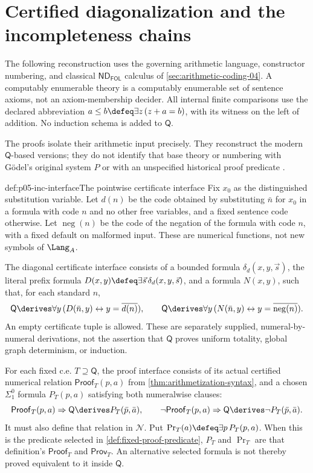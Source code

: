 \section{Certified diagonalization and the incompleteness chains}
\label{sec:p05-inc}

The following reconstruction uses the governing arithmetic language,
constructor numbering, and classical \(\mathsf{ND}_{\mathsf{FOL}}\) calculus of
\cref{sec:arithmetic-coding-04}. A computably enumerable theory is a
computably enumerable set of sentence axioms, not an axiom-membership
decider. All internal finite comparisons use the declared abbreviation
\(a\leq b\defeq\exists z\,(z+a=b)\), with its witness on the left of
addition. No induction schema is added to \(\mathsf Q\).

The proofs isolate their arithmetic input precisely. They reconstruct the
modern \(\mathsf Q\)-based versions; they do not identify that base theory
or numbering with G\"odel's original system \(P\)
\cite[Satz V--VI, pp.~186--190]{Godel1931} or with an unspecified historical
proof predicate \cite{Rosser1936}.

\begin{hbdefinition}{def:p05-inc-interface}{The pointwise certificate interface}
Fix \(x_0\) as the distinguished substitution variable. Let \(d(n)\)
be the code obtained by substituting \(\bar n\) for \(x_0\) in a formula
with code \(n\) and no other free variables, and a fixed sentence code
otherwise. Let \(\operatorname{neg}(n)\) be the code of the negation of
the formula with code \(n\), with a fixed default on malformed input.
These are numerical functions, not new symbols of \(\Lang_A\).

The diagonal certificate interface consists of a bounded formula
\(\delta_d(x,y,\vec s)\), the literal prefix formula
\(D(x,y)\defeq\exists\vec s\,\delta_d(x,y,\vec s)\), and a formula
\(N(x,y)\), such that, for each standard \(n\),
\[
 \mathsf Q\derives\forall y\,
       (D(\bar n,y)\leftrightarrow y=\overline{d(n)}),
 \qquad
 \mathsf Q\derives\forall y\,
       (N(\bar n,y)\leftrightarrow y=\overline{\operatorname{neg}(n)}).
\]
An empty certificate tuple is allowed. These are separately supplied,
numeral-by-numeral derivations, not the assertion that \(\mathsf Q\)
proves uniform totality, global graph determinism, or induction.

For each fixed c.e. \(T\supseteq\mathsf Q\), the proof interface consists
of its actual certified numerical relation \(\mathsf{Proof}_T(p,a)\)
from \cref{thm:arithmetization-syntax}, and a chosen \(\Sigma^0_1\)
formula \(P_T(p,a)\) satisfying both numeralwise clauses:
\[
 \mathsf{Proof}_T(p,a)\Rightarrow
       \mathsf Q\derives P_T(\bar p,\bar a),\qquad
 \neg\mathsf{Proof}_T(p,a)\Rightarrow
       \mathsf Q\derives\neg P_T(\bar p,\bar a).
\]
It must also define that relation in \(\mathcal N\). Put
\(\operatorname{Pr}_T(a)\defeq\exists p\,P_T(p,a)\).
When this is the predicate selected in \cref{def:fixed-proof-predicate},
\(P_T\) and \(\operatorname{Pr}_T\) are that definition's
\(\mathsf{Proof}_T\) and \(\mathsf{Prov}_T\). An alternative selected
formula is not thereby proved equivalent to it inside \(\mathsf Q\).
\end{hbdefinition}

